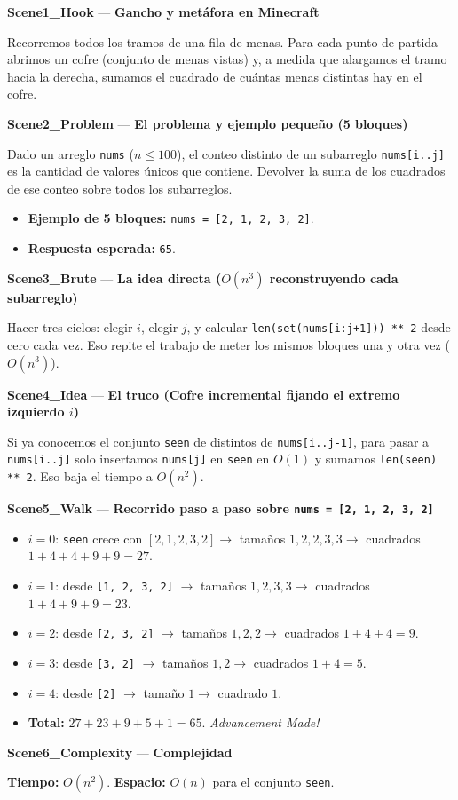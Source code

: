 \documentclass[letterpaper,10pt]{article}
\newcommand{\scene}[2]{\noindent\textbf{\textcolor{mcaqua}{#1}} --- \textbf{#2}\par\vspace{1pt}}
\begin{document}
\begin{shaded}
\scene{Scene1\_Hook}{Gancho y met\'afora en Minecraft}
Recorremos todos los tramos de una fila de menas. Para cada punto de partida abrimos un cofre (conjunto de menas vistas) y, a medida que alargamos el tramo hacia la derecha, sumamos el cuadrado de cu\'antas menas distintas hay en el cofre.

\scene{Scene2\_Problem}{El problema y ejemplo peque\~no (5 bloques)}
Dado un arreglo \texttt{nums} ($n \le 100$), el conteo distinto de un subarreglo \texttt{nums[i..j]} es la cantidad de valores \'unicos que contiene. Devolver la suma de los cuadrados de ese conteo sobre todos los subarreglos.
\begin{itemize}\setlength{\itemsep}{1pt}
  \item \textbf{Ejemplo de 5 bloques:} \texttt{nums = [2, 1, 2, 3, 2]}.
  \item \textbf{Respuesta esperada:} \texttt{65}.
\end{itemize}

\scene{Scene3\_Brute}{La idea directa ($O(n^3)$ reconstruyendo cada subarreglo)}
Hacer tres ciclos: elegir $i$, elegir $j$, y calcular \texttt{len(set(nums[i:j+1])) ** 2} desde cero cada vez. Eso repite el trabajo de meter los mismos bloques una y otra vez ($O(n^3)$).

\scene{Scene4\_Idea}{El truco (Cofre incremental fijando el extremo izquierdo $i$)}
Si ya conocemos el conjunto \texttt{seen} de distintos de \texttt{nums[i..j-1]}, para pasar a \texttt{nums[i..j]} solo insertamos \texttt{nums[j]} en \texttt{seen} en $O(1)$ y sumamos \texttt{len(seen) ** 2}. Eso baja el tiempo a $O(n^2)$.

\scene{Scene5\_Walk}{Recorrido paso a paso sobre \texttt{nums = [2, 1, 2, 3, 2]}}
\begin{itemize}\setlength{\itemsep}{1pt}
  \item $i = 0$: \texttt{seen} crece con $[2, 1, 2, 3, 2] \to$ tama\~nos $1, 2, 2, 3, 3 \to$ cuadrados $1 + 4 + 4 + 9 + 9 = 27$.
  \item $i = 1$: desde \texttt{[1, 2, 3, 2]} $\to$ tama\~nos $1, 2, 3, 3 \to$ cuadrados $1 + 4 + 9 + 9 = 23$.
  \item $i = 2$: desde \texttt{[2, 3, 2]} $\to$ tama\~nos $1, 2, 2 \to$ cuadrados $1 + 4 + 4 = 9$.
  \item $i = 3$: desde \texttt{[3, 2]} $\to$ tama\~nos $1, 2 \to$ cuadrados $1 + 4 = 5$.
  \item $i = 4$: desde \texttt{[2]} $\to$ tama\~no $1 \to$ cuadrado $1$.
  \item \textbf{Total:} $27 + 23 + 9 + 5 + 1 = 65$. \textit{Advancement Made!}
\end{itemize}

\scene{Scene6\_Complexity}{Complejidad}
\textbf{Tiempo:} $O(n^2)$. \quad \textbf{Espacio:} $O(n)$ para el conjunto \texttt{seen}.
\end{shaded}
\end{document}
